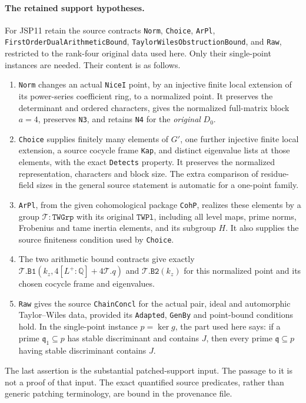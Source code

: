 \paragraph{The retained support hypotheses.}
For JSP11 retain the source contracts \texttt{Norm},
\texttt{Choice}, \texttt{ArPl},
\texttt{FirstOrderDualArithmeticBound},
\texttt{TaylorWilesObstructionBound}, and \texttt{Raw}, restricted
to the rank-four original data used here. Only their single-point
instances are needed. Their content is as follows.
\begin{enumerate}
\item \texttt{Norm} changes an actual \texttt{NiceI} point, by an
injective finite local extension of its power-series coefficient
ring, to a normalized point. It preserves the determinant and
ordered characters, gives the normalized full-matrix block
$a=4$, preserves \texttt{N3}, and retains \texttt{N4} for the
\emph{original} $D_0$.
\item \texttt{Choice} supplies finitely many elements of $G'$,
one further injective finite local extension, a source cocycle
frame \texttt{Kap}, and distinct eigenvalue lists at those
elements, with the exact \texttt{Detects} property. It
preserves the normalized representation, characters and block
size. The extra comparison of residue-field sizes in the
general source statement is automatic for a one-point family.
\item \texttt{ArPl}, from the given cohomological package
\texttt{CohP}, realizes these elements by a group
$\mathcal T:\texttt{TWGrp}$ with its original
$\texttt{TWPl}$, including all level maps, prime norms,
Frobenius and tame inertia elements, and its subgroup $H$.
It also supplies the source finiteness condition used by
\texttt{Choice}.
\item The two arithmetic bound contracts give exactly
$\mathcal T.\texttt{B1}(k_z,4[L^+:\mathbb Q]+4\mathcal T.q)$
and $\mathcal T.\texttt{B2}(k_z)$ for this normalized point
and its chosen cocycle frame and eigenvalues.
\item \texttt{Raw} gives the source \texttt{ChainConcl} for
the actual pair, ideal and automorphic Taylor--Wiles data,
provided its \texttt{Adapted}, \texttt{GenBy} and point-bound
conditions hold. In the single-point instance $p=\ker g$,
the part used here says: if a prime
$\mathfrak q_1\subseteq p$ has stable discriminant and
contains $J$, then every prime $\mathfrak q\subseteq p$
having stable discriminant contains $J$.
\end{enumerate}
The last assertion is the substantial patched-support input.
The passage to it is not a proof of that input. The exact
quantified source predicates, rather than generic patching
terminology, are bound in the provenance file.

